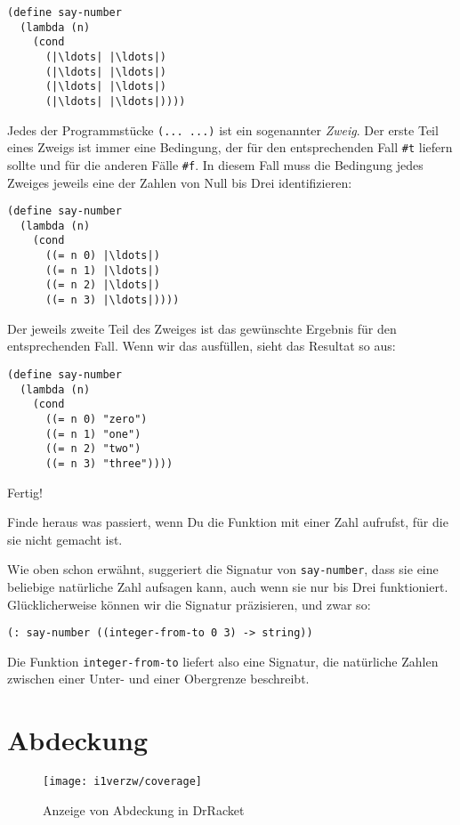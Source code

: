 \begin{lstlisting}
(define say-number
  (lambda (n)
    (cond
      (|\ldots| |\ldots|)
      (|\ldots| |\ldots|)
      (|\ldots| |\ldots|)
      (|\ldots| |\ldots|))))
\end{lstlisting}
%
Jedes der Programmstücke \lstinline{(... ...)} ist ein sogenannter
\textit{Zweig}.  Der erste Teil eines Zweigs ist immer
eine Bedingung, der für den entsprechenden Fall \lstinline{#t} liefern
sollte und für die anderen Fälle \lstinline{#f}.  In diesem Fall muss die
Bedingung jedes Zweiges jeweils eine der Zahlen von Null bis Drei
identifizieren:
%
\begin{lstlisting}
(define say-number
  (lambda (n)
    (cond
      ((= n 0) |\ldots|)
      ((= n 1) |\ldots|)
      ((= n 2) |\ldots|)
      ((= n 3) |\ldots|))))
\end{lstlisting}
%
Der jeweils zweite Teil des Zweiges ist das gewünschte Ergebnis für
den entsprechenden Fall.  Wenn wir das ausfüllen, sieht das Resultat
so aus:
%
\begin{lstlisting}
(define say-number
  (lambda (n)
    (cond
      ((= n 0) "zero")
      ((= n 1) "one")
      ((= n 2) "two")
      ((= n 3) "three"))))
\end{lstlisting}
%
Fertig!
\begin{aufgabeinline}
  Finde heraus was passiert, wenn Du die Funktion mit einer Zahl
  aufrufst, für die sie nicht gemacht ist.
\end{aufgabeinline}
%
Wie oben schon erwähnt, suggeriert die Signatur von
\lstinline{say-number}, dass sie eine beliebige natürliche Zahl
aufsagen kann, auch wenn sie nur bis Drei funktioniert.
Glücklicherweise können wir die Signatur präzisieren, und zwar so:
%
\begin{lstlisting}
(: say-number ((integer-from-to 0 3) -> string))
\end{lstlisting}
%
Die Funktion
\lstinline{integer-from-to}
liefert also eine Signatur, die natürliche Zahlen zwischen einer Unter-
und einer Obergrenze beschreibt.\label{function:integer-from-to}

\section{Abdeckung}
\label{sec:testabdeckung}

\begin{figure}[tb]
  \centering
  \texttt{[image: i1verzw/coverage]}
  \caption{Anzeige von Abdeckung in DrRacket}
  \label{fig:coverage}
\end{figure}

